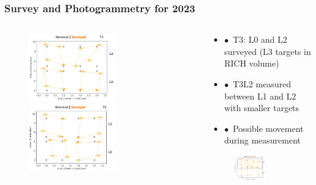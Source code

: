 \documentclass[aspectratio=1610, 12pt, xcolor=dvipsnames]{beamer}
\begin{document}
\begin{frame}\frametitle{Survey and Photogrammetry for 2023}
  \begin{columns}
    \begin{column}[c]{0.48\textwidth}
      \begin{figure}
        \includegraphics[width=0.6\textwidth]{plots/survey_T1.png}
        \includegraphics[width=0.6\textwidth]{plots/survey_T2.png}
      \end{figure}
    \end{column}
    \begin{column}[c]{0.48\textwidth}
      \begin{itemize}
        \item $\bullet$\, T3: L0 and L2 surveyed (L3 targets in RICH volume)
        \item $\bullet$\, T3L2 measured between L1 and L2 with smaller targets
        \item $\bullet$\, Possible movement during measurement
      \end{itemize}
      \begin{figure}
        \includegraphics[width=0.6\textwidth]{plots/survey_T3.png}
      \end{figure}
    \end{column}
  \end{columns}
\end{frame}
\end{document}
